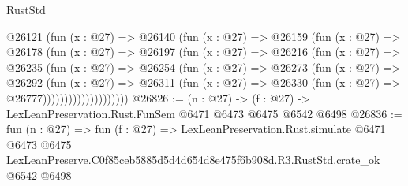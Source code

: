 \begin{lexlean}{RustStd}
\begin{coremodule}
                  @26121
                    (fun (x : @27) =>
                    @26140
                      (fun (x : @27) =>
                      @26159
                        (fun (x : @27) =>
                        @26178
                          (fun (x : @27) =>
                          @26197
                            (fun (x : @27) =>
                            @26216
                              (fun (x : @27) =>
                              @26235
                                (fun (x : @27) =>
                                @26254
                                  (fun (x : @27) =>
                                  @26273
                                    (fun (x : @27) =>
                                    @26292
                                      (fun (x : @27) =>
                                      @26311
                                        (fun (x : @27) =>
                                        @26330 (fun (x : @27) => @26777))))))))))))))))))))
@26826 := (n : @27) -> (f : @27) -> LexLeanPreservation.Rust.FunSem @6471 @6473 @6475 @6542 @6498
@26836 := fun (n : @27) =>
  fun (f : @27) =>
  LexLeanPreservation.Rust.simulate
    @6471
    @6473
    @6475
    LexLeanPreserve.C0f85ceb5885d5d4d654d8e475f6b908d.R3.RustStd.crate_ok
    @6542
    @6498
\end{coremodule}
\end{lexlean}
